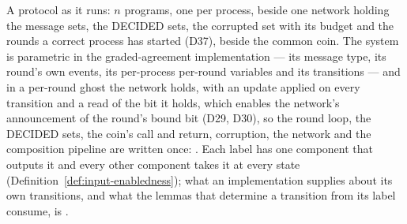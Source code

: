 \begin{definition}
  \label{def:aba-implementation}
  \leanok
  A protocol as it runs: $n$ programs, one per process, beside one network holding the message sets, the DECIDED sets, the corrupted set with its budget and the rounds a correct process has started (D37), beside the common coin.
  The system is parametric in the graded-agreement implementation --- its message type, its round's own events, its per-process per-round variables and its transitions --- and in a per-round ghost the network holds, with an update  applied on every transition and a read of the bit it holds, which enables the network's announcement of the round's bound bit (D29, D30), so the round loop, the DECIDED sets, the coin's call and return, corruption, the network and the composition pipeline are written once: .
  Each label has one component that outputs it and every other component takes it at every state (Definition~\ref{def:input-enabledness}); what an implementation supplies about its own transitions, and what the lemmas that determine a transition from its label consume, is .
\end{definition}
